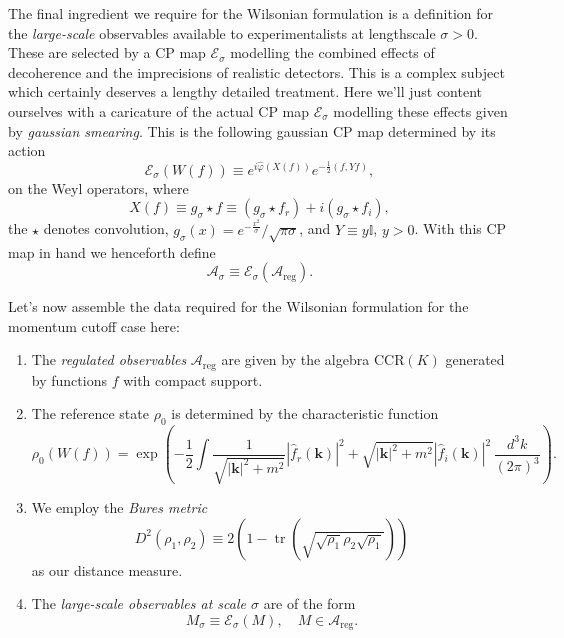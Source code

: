 \documentclass[11pt]{amsart}
\DeclareMathOperator{\tr}{tr}
\theoremstyle{plain}%
\theoremstyle{definition}
\theoremstyle{remark}
\begin{document}
The final ingredient we require for the Wilsonian formulation is a definition for the \emph{large-scale} observables available to experimentalists at lengthscale $\sigma > 0$. These are selected by a CP map $\mathcal{E}_\sigma$ modelling the combined effects of decoherence and the imprecisions of realistic detectors. This is a complex subject which certainly deserves a lengthy detailed treatment. Here we'll just content ourselves with a caricature of the actual CP map $\mathcal{E}_\sigma$ modelling these effects given by \emph{gaussian smearing}. This is the following gaussian CP map determined by its action 
\begin{equation}
	\mathcal{E}_\sigma(W(f)) \equiv e^{i\widehat{\varphi}(X(f))}e^{-\frac12(f,Yf)},
\end{equation}
on the Weyl operators, where
\begin{equation}
	X(f) \equiv g_\sigma\star f \equiv (g_\sigma \star f_r) + i (g_\sigma \star f_i),
\end{equation}
the $\star$ denotes convolution, $g_\sigma(x) = e^{-\frac{x^2}{\sigma}}/\sqrt{\pi\sigma}$, and $Y \equiv y \mathbb{I}$, $y> 0$. With this CP map in hand we henceforth define 
\begin{equation}
	\mathcal{A}_\sigma \equiv \mathcal{E}_\sigma (\mathcal{A}_{\text{reg}}).
\end{equation}

Let's now assemble the data required for the Wilsonian formulation for the momentum cutoff case here:
\begin{enumerate}
	\item The \emph{regulated observables} $\mathcal{A}_{\text{reg}}$ are given by the algebra $\text{CCR}(K)$ generated by functions $f$ with compact support.
	\item The reference state $\rho_0$ is determined by the characteristic function
	\begin{equation*}
		\rho_0(W(f)) = \exp\left(-\frac{1}{2}\int \frac{1}{\sqrt{|\mathbf{k}|^2 + m^2}}|\widehat{f}_r(\mathbf{k})|^2 + \sqrt{|\mathbf{k}|^2 + m^2}|\widehat{f}_i(\mathbf{k})|^2 \,\frac{d^3k}{(2\pi)^3} \right).
	\end{equation*}
	\item We employ the \emph{Bures metric} 
	\begin{equation*}
		D^2(\rho_1,\rho_2) \equiv 2\left(1-\tr\left(\sqrt{\sqrt{\rho_1}\rho_2\sqrt{\rho_1}}\right)\right)
	\end{equation*}
	as our distance measure.
	\item The \emph{large-scale observables at scale $\sigma$} are of the form
	\begin{equation*}
		M_\sigma \equiv \mathcal{E}_\sigma(M), \quad M\in \mathcal{A}_{\text{reg}}.	
	\end{equation*}
\end{enumerate}
\end{document}
